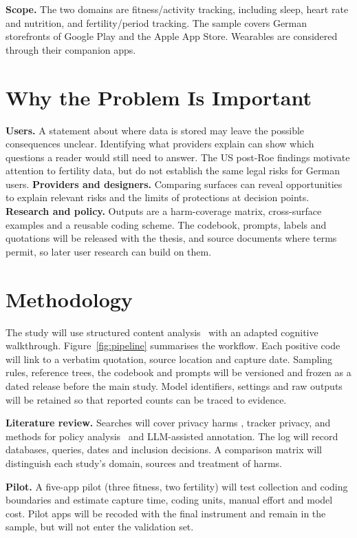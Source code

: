 \documentclass[sigconf,nonacm,natbib=false]{acmart}
\begin{document}
\noindent\textbf{Scope.} The two domains are fitness/activity tracking,
including sleep, heart rate and nutrition, and fertility/period tracking.
The sample covers German storefronts of Google Play and the Apple App Store.
Wearables are considered through their companion apps.

\section{Why the Problem Is Important}

\textbf{Users.} A statement about where data is stored may leave the possible
consequences unclear. Identifying what providers explain can show which
questions a reader would still need to answer. The US
post-Roe findings motivate attention to fertility data, but do not establish
the same legal risks for German users.
\textbf{Providers and designers.} Comparing surfaces can reveal opportunities
to explain relevant risks and the limits of protections at decision points.
\textbf{Research and policy.} Outputs are a harm-coverage matrix,
cross-surface examples and a reusable coding scheme. The codebook, prompts,
labels and quotations will be released with the thesis, and source documents
where terms permit, so later user research can build on them.

\section{Methodology}

The study will use structured content analysis~\parencite{krippendorff2019content}
with an adapted cognitive walkthrough. Figure~\ref{fig:pipeline} summarises
the workflow. Each positive code will link to a verbatim quotation, source
location and capture date. Sampling rules, reference trees, the codebook and
prompts will be versioned and frozen as a dated release before the main study.
Model identifiers, settings and raw outputs will be retained so that reported
counts can be traced to evidence.

\textbf{Literature review.} Searches will cover privacy harms
\parencite{solove2006taxonomy,calo2011boundaries}, tracker privacy, and
methods for policy analysis~\parencite{wilson2016creation,zimmeck2019maps}
and LLM-assisted annotation. The log will record databases, queries, dates and
inclusion decisions. A comparison matrix will distinguish each study's domain,
sources and treatment of harms.

\textbf{Pilot.} A five-app pilot (three fitness, two fertility) will test
collection and coding boundaries and estimate capture time, coding units,
manual effort and model cost. Pilot apps will be recoded with the final
instrument and remain in the sample, but will not enter the validation set.
\end{document}
